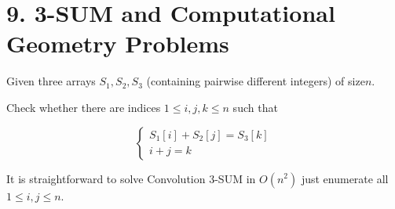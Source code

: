 \section{9. 3-SUM and Computational Geometry Problems}

\begin{df}
  Given three arrays $S_1, S_2, S_3$ (containing pairwise different integers) of size$n$.

  Check whether there are indices $1 \leq i, j, k \leq n$ such that

  \begin{equation*}
	\begin{cases}
	  S_1[i] + S_2[j] = S_3[k]\\
	  i + j = k
	\end{cases}
  \end{equation*}

  It is straightforward to solve Convolution 3-SUM in $O(n^2)$ just enumerate all $1 \leq i, j \leq n$.
\end{df}

